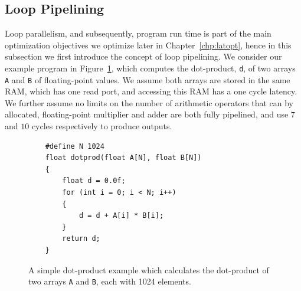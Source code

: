 \subsection{Loop Pipelining}
\label{bg:sub:pipelining}

Loop parallelism, and subsequently, program run time is part of the main
optimization objectives we optimize later in Chapter~\ref{chp:latopt}, hence
in this subsection we first introduce the concept of loop pipelining.  We
consider our example program in Figure~\ref{bg:lst:dotprod}, which computes the
dot-product, \verb|d|, of two arrays \verb|A| and \verb|B| of floating-point
values.  We assume both arrays are stored in the same RAM, which has one read
port, and accessing this RAM has a one cycle latency.  We further assume
no limits on the number of arithmetic operators that can by allocated,
floating-point multiplier and adder are both fully pipelined, and use $7$ and
$10$ cycles respectively to produce outputs.
\begin{figure}[ht]
    \centering
    \begin{minipage}{0.7\textwidth}
    \begin{lstlisting}
    #define N 1024
    float dotprod(float A[N], float B[N])
    {
        float d = 0.0f;
        for (int i = 0; i < N; i++)
        {
            d = d + A[i] * B[i];
        }
        return d;
    }
    \end{lstlisting}
    \end{minipage}
    \caption{%
        A simple dot-product example which calculates the dot-product of two
        arrays \texttt{A} and \texttt{B}, each with 1024 elements.
    }\label{bg:lst:dotprod}
\end{figure}

